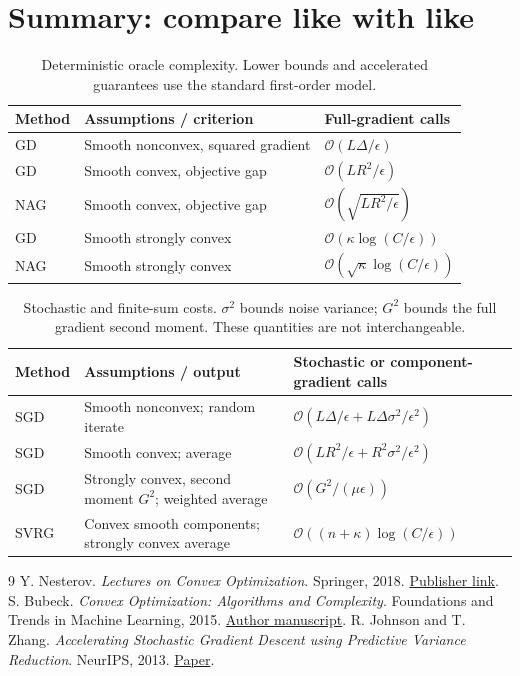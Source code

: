 \documentclass[11pt]{article}
\begin{document}
\section{Summary: compare like with like}
\begin{table}[H]\centering\small
\renewcommand{\arraystretch}{1.35}
\begin{tabular}{@{}lll@{}}\toprule
Method & Assumptions / criterion & Full-gradient calls\\\midrule
GD & Smooth nonconvex, squared gradient & $\mathcal O(L\Delta/\epsilon)$\\
GD & Smooth convex, objective gap & $\mathcal O(LR^2/\epsilon)$\\
NAG & Smooth convex, objective gap & $\mathcal O(\sqrt{LR^2/\epsilon})$\\
GD & Smooth strongly convex & $\mathcal O(\kappa\log(C/\epsilon))$\\
NAG & Smooth strongly convex & $\mathcal O(\sqrt\kappa\log(C/\epsilon))$\\\bottomrule
\end{tabular}
\caption{Deterministic oracle complexity. Lower bounds and accelerated guarantees use the standard first-order model.}
\end{table}

\begin{table}[H]\centering\small
\renewcommand{\arraystretch}{1.35}
\begin{tabular}{@{}lp{3.1cm}p{6.4cm}@{}}\toprule
Method & Assumptions / output & Stochastic or component-gradient calls\\\midrule
SGD & Smooth nonconvex; random iterate & $\mathcal O(L\Delta/\epsilon+L\Delta\sigma^2/\epsilon^2)$\\
SGD & Smooth convex; average & $\mathcal O(LR^2/\epsilon+R^2\sigma^2/\epsilon^2)$\\
SGD & Strongly convex, second moment $G^2$; weighted average & $\mathcal O(G^2/(\mu\epsilon))$\\
SVRG & Convex smooth components; strongly convex average & $\mathcal O((n+\kappa)\log(C/\epsilon))$\\\bottomrule
\end{tabular}
\caption{Stochastic and finite-sum costs. $\sigma^2$ bounds noise variance; $G^2$ bounds the full gradient second moment. These quantities are not interchangeable.}
\end{table}

\begin{thebibliography}{9}
 Y. Nesterov. \textit{Lectures on Convex Optimization}. Springer, 2018. \href{https://doi.org/10.1007/978-3-319-91578-4}{Publisher link}.
 S. Bubeck. \textit{Convex Optimization: Algorithms and Complexity}. Foundations and Trends in Machine Learning, 2015. \href{https://arxiv.org/abs/1405.4980}{Author manuscript}.
 R. Johnson and T. Zhang. \textit{Accelerating Stochastic Gradient Descent using Predictive Variance Reduction}. NeurIPS, 2013. \href{https://papers.nips.cc/paper/2013/hash/ac1dd209cbcc5e5d1c6e28598e8cbbe8-Abstract.html}{Paper}.
\end{thebibliography}
\end{document}
